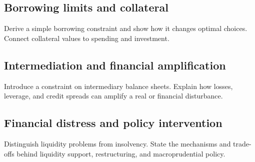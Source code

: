 \label{sec:financial-frictions}

\subsection{Borrowing limits and collateral}
Derive a simple borrowing constraint and show how it changes optimal choices.
Connect collateral values to spending and investment.

\subsection{Intermediation and financial amplification}
Introduce a constraint on intermediary balance sheets. Explain how losses,
leverage, and credit spreads can amplify a real or financial disturbance.

\subsection{Financial distress and policy intervention}
Distinguish liquidity problems from insolvency. State the mechanisms and
trade-offs behind liquidity support, restructuring, and macroprudential policy.
